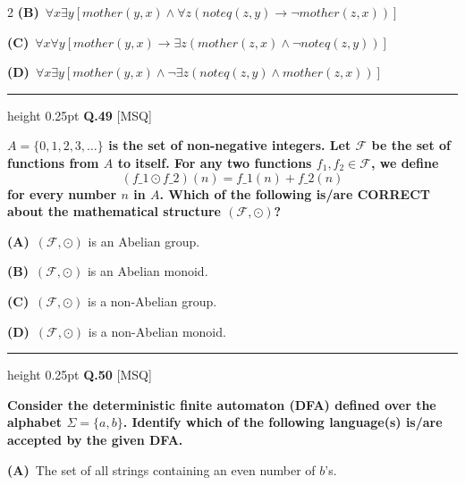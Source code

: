 \documentclass[a4paper,10pt,twoside]{article}
\begin{document}
\begin{multicols}{2}
\textbf{(B)}~$\forall x \exists y [mother(y, x) \land \forall z (noteq(z, y) \to \neg mother(z, x))]$\par\vspace{2pt}\noindent
\textbf{(C)}~$\forall x \forall y [mother(y, x) \to \exists z (mother(z, x) \land \neg noteq(z, y))]$\par\vspace{2pt}\noindent
\textbf{(D)}~$\forall x \exists y [mother(y, x) \land \neg \exists z (noteq(z, y) \land mother(z, x))]$
\par\vspace{6pt}\hrule height 0.25pt\vspace{6pt}
\noindent\textbf{Q.49} \hfill {\footnotesize\textsf{[MSQ]}}
\par\vspace{2pt}
{\bfseries $A = \{0, 1, 2, 3, \dots \}$ is the set of non-negative integers. Let $\mathcal{F}$ be the set of functions from $A$ to itself. For any two functions $f_1, f_2 \in \mathcal{F}$, we define
\[ (f\_1 \odot f\_2)(n) = f\_1(n) + f\_2(n) \]
for every number $n$ in $A$. Which of the following is/are CORRECT about the mathematical structure $(\mathcal{F}, \odot)$? \par}
\par\vspace{2pt}\noindent
\textbf{(A)}~$(\mathcal{F}, \odot)$ is an Abelian group.\par\vspace{2pt}\noindent
\textbf{(B)}~$(\mathcal{F}, \odot)$ is an Abelian monoid.\par\vspace{2pt}\noindent
\textbf{(C)}~$(\mathcal{F}, \odot)$ is a non-Abelian group.\par\vspace{2pt}\noindent
\textbf{(D)}~$(\mathcal{F}, \odot)$ is a non-Abelian monoid.
\par\vspace{6pt}\hrule height 0.25pt\vspace{6pt}
\noindent\textbf{Q.50} \hfill {\footnotesize\textsf{[MSQ]}}
\par\vspace{2pt}
{\bfseries Consider the deterministic finite automaton (DFA) defined over the alphabet $\Sigma = \{a, b\}$. Identify which of the following language(s) is/are accepted by the given DFA. \par}
\par\vspace{2pt}\noindent
\textbf{(A)}~The set of all strings containing an even number of $b$'s.\par\vspace{2pt}\noindent

\end{multicols}
\end{document}
